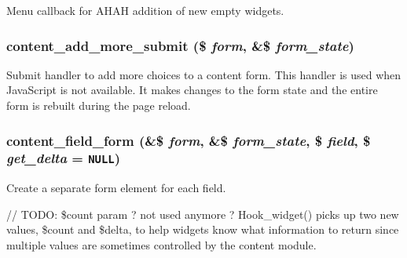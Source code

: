 Menu callback for AHAH addition of new empty widgets. \hypertarget{content_8node__form_8inc_7a3e05d2af0db78a12f4da6389c65f4e}{
\subsubsection[{content\_\-add\_\-more\_\-submit}]{\setlength{\rightskip}{0pt plus 5cm}content\_\-add\_\-more\_\-submit (\$ {\em form}, \/  \&\$ {\em form\_\-state})}}
\label{content_8node__form_8inc_7a3e05d2af0db78a12f4da6389c65f4e}


Submit handler to add more choices to a content form. This handler is used when JavaScript is not available. It makes changes to the form state and the entire form is rebuilt during the page reload. \hypertarget{content_8node__form_8inc_71a4a36ac11328e4421fbfab0d61ce53}{
\subsubsection[{content\_\-field\_\-form}]{\setlength{\rightskip}{0pt plus 5cm}content\_\-field\_\-form (\&\$ {\em form}, \/  \&\$ {\em form\_\-state}, \/  \$ {\em field}, \/  \$ {\em get\_\-delta} = {\tt NULL})}}
\label{content_8node__form_8inc_71a4a36ac11328e4421fbfab0d61ce53}


Create a separate form element for each field.

// TODO: \$count param ? not used anymore ? Hook\_\-widget() picks up two new values, \$count and \$delta, to help widgets know what information to return since multiple values are sometimes controlled by the content module.

